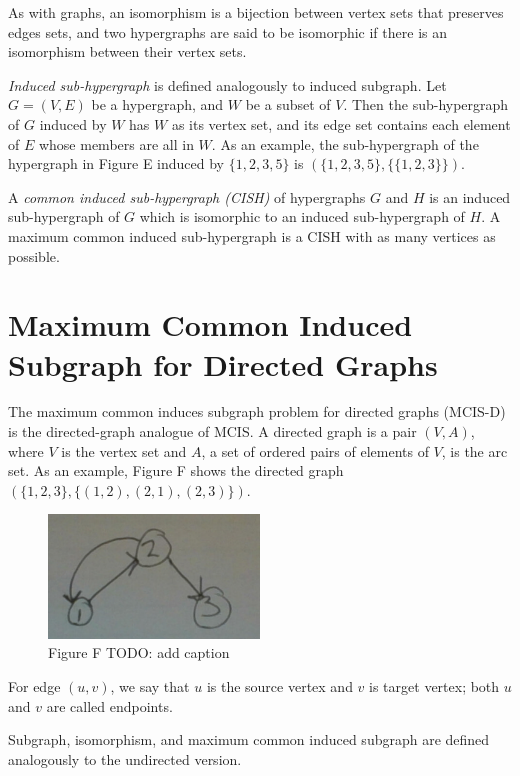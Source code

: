 As with graphs, an isomorphism is a bijection between vertex sets that
preserves edges sets, and two hypergraphs are said to be isomorphic if there is
an isomorphism between their vertex sets.

\emph{Induced sub-hypergraph} is defined analogously to induced subgraph.  Let $G=(V,E)$
be a hypergraph, and $W$ be a subset of $V$. Then the sub-hypergraph of $G$ induced
by $W$ has $W$ as its vertex set, and its edge set contains each element of $E$ whose
members are all in $W$. As an example, the sub-hypergraph of the hypergraph in
Figure E induced by $\{1,2,3,5\}$ is $(\{1,2,3,5\}, \{\{1,2,3\}\})$.

A \emph{common induced sub-hypergraph (CISH)} of hypergraphs $G$ and $H$ is an induced
sub-hypergraph of $G$ which is isomorphic to an induced sub-hypergraph of $H$. A
maximum common induced sub-hypergraph is a CISH with as many vertices as
possible.

\section{Maximum Common Induced Subgraph for Directed Graphs}

The maximum common induces subgraph problem for directed graphs (MCIS-D) is the
directed-graph analogue of MCIS.  A directed graph is a pair $(V,A)$, where $V$ is
the vertex set and $A$, a set of ordered pairs of elements of $V$, is the arc set.
As an example, Figure F shows the directed graph $(\{1,2,3\}, \{(1,2), (2,1),
(2,3)\})$.

\begin{figure}[h!]
\centering
\includegraphics[width=0.5\textwidth]{10-introduction/img/figureF}
\caption{Figure F TODO: add caption}
\end{figure}

For edge $(u,v)$, we say that $u$ is the source vertex and $v$ is target vertex; both
$u$ and $v$ are called endpoints.

Subgraph, isomorphism, and maximum common induced subgraph are defined
analogously to the undirected version.


